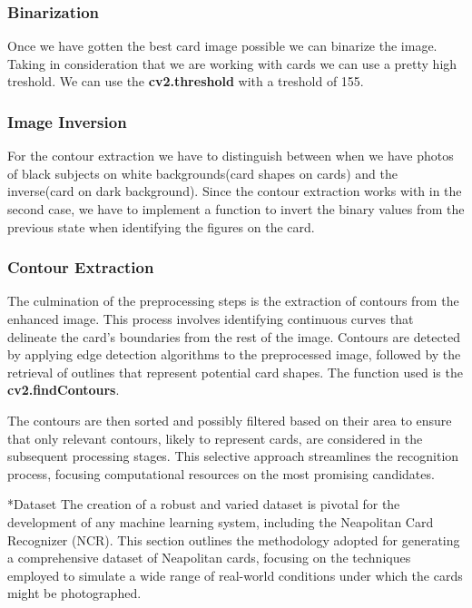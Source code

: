 \documentclass[twocolumn, a4paper,10pt]{article}
\makeatletter
\renewcommand\subsection{\@startsection{subsection}{1}{\z@}{\z@}{\z@}{\normalfont\normalsize\bfseries}}
\renewcommand\subsection{\@startsection{subsection}{1}{\z@}{\z@}{0.1pt}{\normalfont\normalsize\bfseries}}
\makeatother
\begin{document}
\subsubsection*{Binarization}
Once we have gotten the best card image possible we can binarize the image. Taking in consideration that we are working with cards we can use a pretty high treshold. We can use the \textbf{cv2.threshold}  with a treshold of 155.

\subsubsection*{Image Inversion}
For the contour extraction we have to distinguish between when we have photos of black subjects on white backgrounds(card shapes on cards) and the inverse(card on dark background).
Since the contour extraction works with in the second case, we have to implement a function to invert the binary values from the previous state when identifying the figures on the card.

 \subsubsection*{Contour Extraction}
The culmination of the preprocessing steps is the extraction of contours from the enhanced image. This process involves identifying continuous curves that delineate the card's boundaries from the rest of the image. Contours are detected by applying edge detection algorithms to the preprocessed image, followed by the retrieval of outlines that represent potential card shapes. The function used is the \textbf{cv2.findContours}.

The contours are then sorted and possibly filtered based on their area to ensure that only relevant contours, likely to represent cards, are considered in the subsequent processing stages. This selective approach streamlines the recognition process, focusing computational resources on the most promising candidates.

\subsection*{Dataset}
The creation of a robust and varied dataset is pivotal for the development of any machine learning system, including the Neapolitan Card Recognizer (NCR). This section outlines the methodology adopted for generating a comprehensive dataset of Neapolitan cards, focusing on the techniques employed to simulate a wide range of real-world conditions under which the cards might be photographed.
\end{document}
